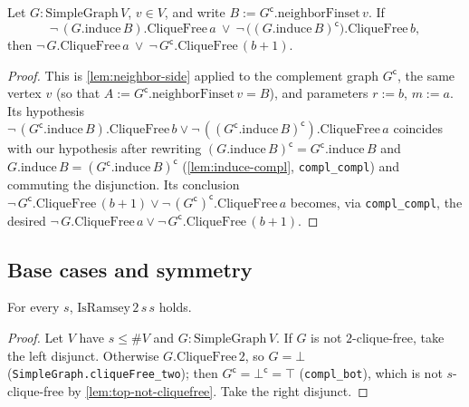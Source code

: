 \begin{lemma}
    \label{lem:neighbor-side-compl}
    \leanok
    Let $G : \mathrm{SimpleGraph}\, V$, $v \in V$, and write
    $B := G^{\mathsf c}.\mathrm{neighborFinset}\, v$. If
    \[
        \neg\,(G.\mathrm{induce}\, B).\mathrm{CliqueFree}\, a \ \lor\
        \neg\,\bigl((G.\mathrm{induce}\, B)^{\mathsf c}\bigr).\mathrm{CliqueFree}\, b ,
    \]
    then
    $\neg\, G.\mathrm{CliqueFree}\, a \ \lor\ \neg\, G^{\mathsf c}.\mathrm{CliqueFree}\,(b{+}1)$.
\end{lemma}
\begin{proof}
    This is \cref{lem:neighbor-side} applied to the complement graph
    $G^{\mathsf c}$, the same vertex $v$ (so that
    $A := G^{\mathsf c}.\mathrm{neighborFinset}\, v = B$), and parameters $r := b$,
    $m := a$. Its hypothesis
    $\neg\,(G^{\mathsf c}.\mathrm{induce}\, B).\mathrm{CliqueFree}\, b \lor
    \neg\,((G^{\mathsf c}.\mathrm{induce}\, B)^{\mathsf c}).\mathrm{CliqueFree}\, a$
    coincides with our hypothesis after rewriting
    $(G.\mathrm{induce}\, B)^{\mathsf c} = G^{\mathsf c}.\mathrm{induce}\, B$ and
    $G.\mathrm{induce}\, B = (G^{\mathsf c}.\mathrm{induce}\, B)^{\mathsf c}$
    (\cref{lem:induce-compl}, \texttt{compl\_compl}) and commuting the disjunction.
    Its conclusion
    $\neg\, G^{\mathsf c}.\mathrm{CliqueFree}\,(b{+}1) \lor
    \neg\,(G^{\mathsf c})^{\mathsf c}.\mathrm{CliqueFree}\, a$ becomes, via
    \texttt{compl\_compl}, the desired
    $\neg\, G.\mathrm{CliqueFree}\, a \lor \neg\, G^{\mathsf c}.\mathrm{CliqueFree}\,(b{+}1)$.
\end{proof}

\subsection{Base cases and symmetry}

\begin{lemma}[Base case $r = 2$]
    \label{lem:base}
    \leanok
    For every $s$, $\mathrm{IsRamsey}\, 2\, s\, s$ holds.
\end{lemma}
\begin{proof}
    Let $V$ have $s \le \#V$ and $G : \mathrm{SimpleGraph}\, V$. If $G$ is not
    $2$-clique-free, take the left disjunct. Otherwise $G.\mathrm{CliqueFree}\, 2$,
    so $G = \bot$ (\texttt{SimpleGraph.cliqueFree\_two}); then
    $G^{\mathsf c} = \bot^{\mathsf c} = \top$ (\texttt{compl\_bot}), which is not
    $s$-clique-free by \cref{lem:top-not-cliquefree}. Take the right disjunct.
\end{proof}

